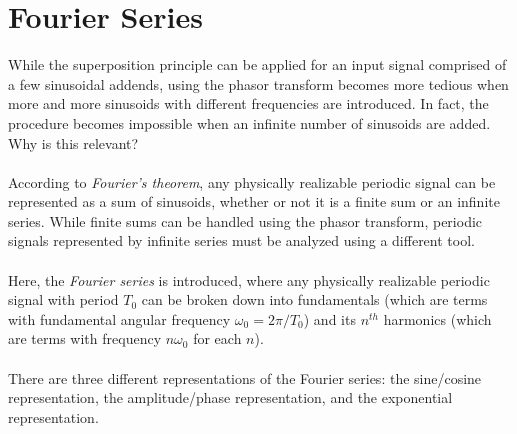 \documentclass{report}
\begin{document}
\section{Fourier Series}
While the superposition principle can be applied for an input signal comprised of a few sinusoidal addends, using the phasor transform becomes more tedious when more and more sinusoids with different frequencies are introduced. 
In fact, the procedure becomes impossible when an infinite number of sinusoids are added. Why is this relevant?
\\ \\
According to \emph{Fourier's theorem}, any physically realizable periodic signal can be represented as a sum of sinusoids, whether or not it is a finite sum or an infinite series. While finite sums can be handled using the phasor transform, periodic signals represented by 
infinite series must be analyzed using a different tool. 
\\ \\ 
Here, the \emph{Fourier series} is introduced, where any physically realizable periodic signal with period $T_0$ can be broken down into fundamentals (which are terms with fundamental angular frequency $\omega_0=2\pi/T_0$) and its $n^{th}$ harmonics 
(which are terms with frequency $n\omega_0$ for each $n$).
\\ \\
There are three different representations of the Fourier series: the sine/cosine representation, the amplitude/phase representation, and the exponential representation.
\end{document}
